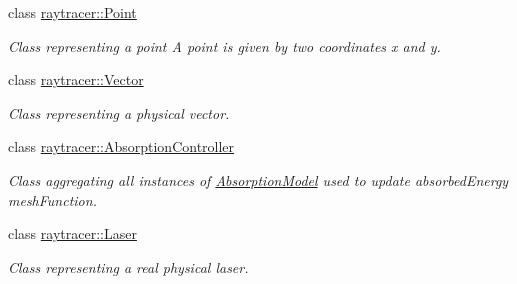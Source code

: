 \begin{DoxyCompactItemize}
class \hyperlink{classraytracer_1_1Point}{raytracer\+::\+Point}
\begin{DoxyCompactList}\small\item\em Class representing a point A point is given by two coordinates x and y. \end{DoxyCompactList}\item 
class \hyperlink{classraytracer_1_1Vector}{raytracer\+::\+Vector}
\begin{DoxyCompactList}\small\item\em Class representing a physical vector. \end{DoxyCompactList}\item 
class \hyperlink{classraytracer_1_1AbsorptionController}{raytracer\+::\+Absorption\+Controller}
\begin{DoxyCompactList}\small\item\em Class aggregating all instances of \hyperlink{classraytracer_1_1AbsorptionModel}{Absorption\+Model} used to update absorbed\+Energy mesh\+Function. \end{DoxyCompactList}\item 
class \hyperlink{classraytracer_1_1Laser}{raytracer\+::\+Laser}
\begin{DoxyCompactList}\small\item\em Class representing a real physical laser. \end{DoxyCompactList}\end{DoxyCompactItemize}

